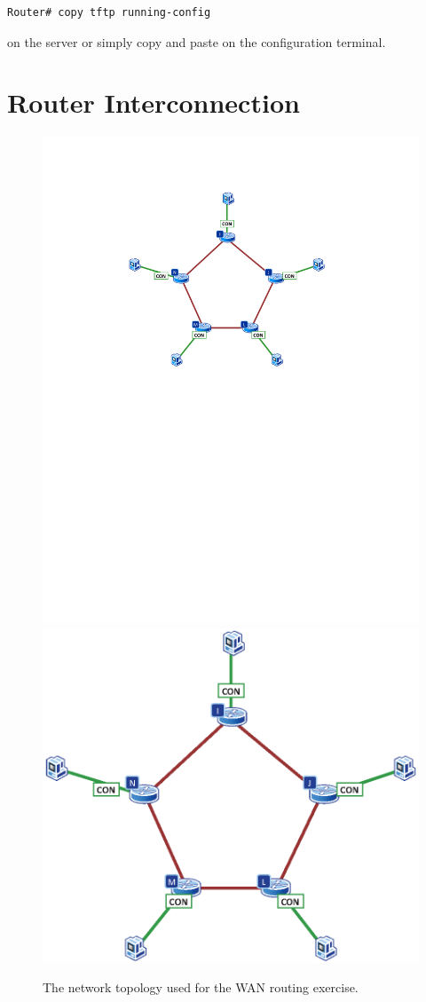 \begin{lstlisting}
Router# copy tftp running-config
\end{lstlisting}

on the server or simply copy and paste on the configuration terminal.

\section{Router Interconnection}

\begin{figure}
\centering
\ifpdf
\includegraphics[width=0.9\linewidth]{Figures/RoutingSerial.pdf}
\else
\includegraphics[width=0.9\linewidth]{Figures/RoutingSerial.eps}
\fi
\caption{The network topology used for the WAN routing exercise.}
\label{fig:RoutingSerial}
\end{figure}

